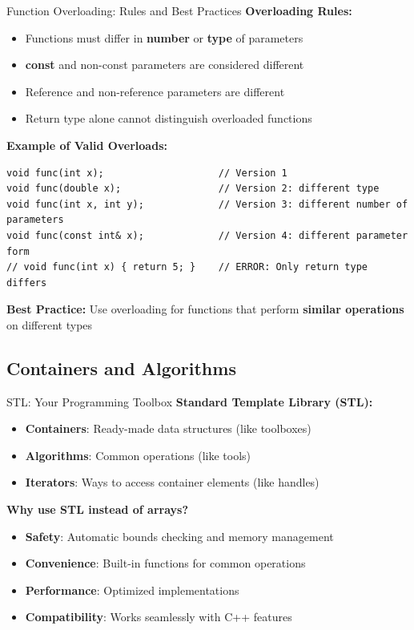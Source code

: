 \begin{frame}[fragile]{Function Overloading: Rules and Best Practices}
    \textbf{Overloading Rules:}
    \begin{itemize}
        \item Functions must differ in \textbf{number} or \textbf{type} of parameters
        \item \textbf{const} and non-const parameters are considered different
        \item Reference and non-reference parameters are different
        \item Return type alone cannot distinguish overloaded functions
    \end{itemize}

    \textbf{Example of Valid Overloads:}
    \begin{verbatim}
void func(int x);                    // Version 1
void func(double x);                 // Version 2: different type
void func(int x, int y);             // Version 3: different number of parameters
void func(const int& x);             // Version 4: different parameter form
// void func(int x) { return 5; }    // ERROR: Only return type differs
    \end{verbatim}

    \textbf{Best Practice:} Use overloading for functions that perform \textbf{similar operations} on different types
\end{frame}

\subsection{Containers and Algorithms}
\begin{frame}[fragile]{STL: Your Programming Toolbox}
	\textbf{Standard Template Library (STL):}
	\begin{itemize}
		\item \textbf{Containers}: Ready-made data structures (like toolboxes)
		\item \textbf{Algorithms}: Common operations (like tools)
		\item \textbf{Iterators}: Ways to access container elements (like handles)
	\end{itemize}

	\vspace{0.5em}
	\textbf{Why use STL instead of arrays?}
	\begin{itemize}
		\item \textbf{Safety}: Automatic bounds checking and memory management
		\item \textbf{Convenience}: Built-in functions for common operations
		\item \textbf{Performance}: Optimized implementations
		\item \textbf{Compatibility}: Works seamlessly with C++ features
	\end{itemize}
\end{frame}

